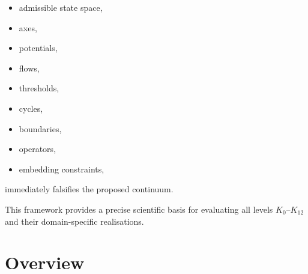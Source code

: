\begin{itemize}
    \item admissible state space,
    \item axes,
    \item potentials,
    \item flows,
    \item thresholds,
    \item cycles,
    \item boundaries,
    \item operators,
    \item embedding constraints,
\end{itemize}

immediately falsifies the proposed continuum.

This framework provides a precise scientific basis for evaluating all
levels $K_0$–$K_{12}$ and their domain-specific realisations.

\section{Overview}
